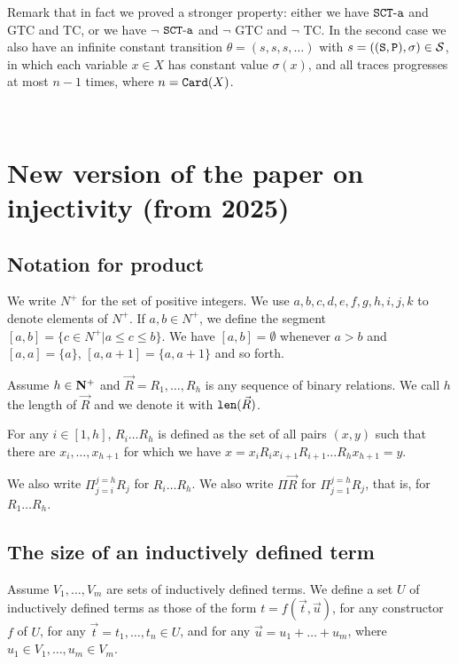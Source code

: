\documentclass{lmcs}
\begin{document}
Remark that in fact we proved a stronger property: either we have ${\tt SCT\mbox{-}a}$ and
GTC and TC, or we have $\neg$ ${\tt SCT\mbox{-}a}$ and $\neg$ GTC and $\neg$ TC. In the
second case we also have an infinite constant transition $\theta = (s, s, s, \ldots)$
with $s = (({\tt S},{\tt P}),\sigma) \in {\mathcal S}$, in which each variable $x \in X$ has constant
value $\sigma(x)$, and all traces progresses at most $n-1$ times, where $n={\tt Card}(X)$.



\newpage
\mbox{ }
\newpage

\section{New version of the paper on injectivity (from 2025)}
\label{section-newversion}

       
\subsection{Notation for product}
We write $N^+$ for the set of positive integers. 
We use $a,b,c,d,e,f,g,h,i,j,k$ to denote elements of $N^+$. 
If $a,b \in N^+$, we define the segment
$[a,b] = \{c \in N^+ | a \le c \le b \}$. 
We have $[a,b] = \emptyset$ whenever $a>b$ and $[a,a] = \{a\}$, $[a,a+1] = \{a,a+1\}$ 
and so forth.

Assume $h \in {\bf N}^+$ and $\vec{R}=R_1, \ldots, R_h$ is any sequence of binary relations.
We call $h$ the length of $\vec{R}$ and we denote it with ${\mbox{\tt len}}(\vec {R})$. 

For any $i \in [1,h]$, $R_i \ldots R_h$ is defined as the set of all pairs $(x,y)$ such that there 
are $x_i, \ldots, x_{h+1}$ for which we have $x=x_i R_i x_{i+1} R_{i+1} \ldots R_{h} 
x_{h+1} = y$. 

We also write $\Pi_{j=i}^{j=h} R_j$ for $R_i \ldots R_h$.
We also write $\Pi \vec{R}$ for $\Pi_{j=1}^{j=h} R_j$, that is, for $R_1 \ldots R_h$.


\subsection{The size of an inductively defined term}

Assume $V_1, \ldots, V_m$ are sets of inductively defined terms.
We define a set $U$ of inductively defined terms as those of the form 
$t = f(\vec{t}, \vec{u})$, for any constructor $f$ of $U$,
for any $\vec{t} = t_1, \ldots, t_n \in U$,
and for any $\vec{u} = u_1 + \ldots + u_m$, where $u_1 \in V_1, \ldots, u_m \in V_m$.
\end{document}
